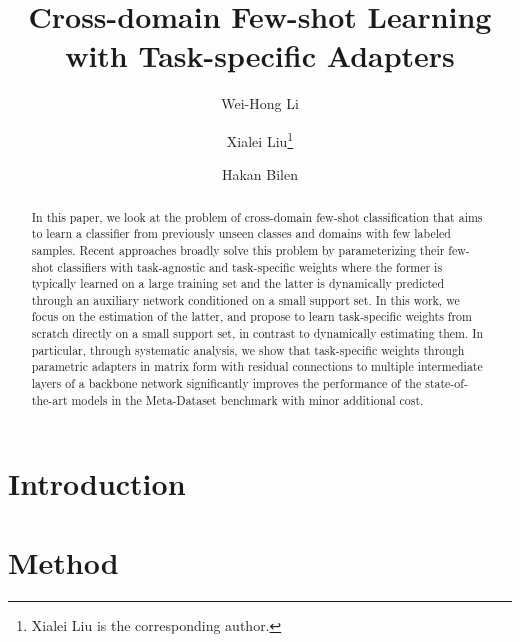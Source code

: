 \documentclass[10pt,twocolumn,letterpaper]{article}
\begin{document}
\title{Cross-domain Few-shot Learning with Task-specific Adapters}


\author[]{\vspace{-0.3cm}Wei-Hong Li}
\author[]{Xialei Liu\thanks{Xialei Liu is the corresponding author.}}
\author[]{Hakan Bilen\vspace{-0.25cm}}


\maketitle

\begin{abstract}
    In this paper, we look at the problem of cross-domain few-shot classification that aims to learn a classifier from previously unseen classes and domains with few labeled samples. 
    Recent approaches broadly solve this problem by parameterizing their few-shot classifiers with task-agnostic and task-specific weights where the former is typically learned on a large training set and the latter is dynamically predicted through an auxiliary network conditioned on a small support set. 
    In this work, we focus on the estimation of the latter, and propose to learn task-specific weights from scratch directly on a small support set, in contrast to dynamically estimating them.
    In particular, through systematic analysis, we show that task-specific weights through parametric adapters in matrix form with residual connections to multiple intermediate layers of a backbone network significantly improves the performance of the state-of-the-art models in the Meta-Dataset benchmark with minor additional cost.
\end{abstract}

\section{Introduction}\label{sec:intro}


\section{Method}\label{sec:method}

\end{document}
